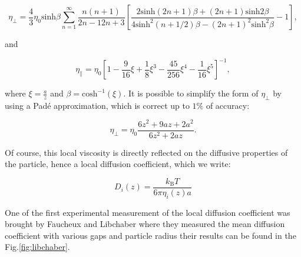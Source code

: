 \begin{equation}
	\eta_\bot = \frac{4}{3} \eta_0 \mathrm{sinh}\beta \sum _{n=1} ^{\infty} \frac{n(n+1)}{{2n-1}{2n+3}}
	\left[
	\frac
	{
		2\mathrm{sinh}(2n + 1)\beta + (2n +1)\mathrm{sinh}2\beta
	}
	{
		4\mathrm{sinh}^2(n + 1 /2)\beta  - (2n+1)^2 \mathrm{sinh}^2 \beta
	}
	-1
	\right] ,
	\label{Eq:etaz}
\end{equation}

and 

\begin{equation}
	\eta_\parallel = \eta_0 
	\left[
		1 - \frac{9}{16} \xi + \frac{1}{8}\xi^3 - \frac{45}{256}\xi^4 - \frac{1}{16}\xi^5
	\right]^{-1},
	\label{Eq:etax}
\end{equation}

where $\xi = \frac{a}{z}$ and $\beta = \mathrm{cosh}^{-1}(\xi)$. It is possible to simplify the form of $\eta_\bot$ by using a Padé approximation, which is correct up to $1\%$ of accuracy:

\begin{equation}
	\eta_\bot = \eta_0 \frac{6z^2 + 9az + 2a^2}{6z^2 + 2az}.
\end{equation}

Of course, this local viscosity is directly reflected on the diffusive properties of the particle, hence a local diffusion coefficient, which we write:

\begin{equation}
	D_i (z) = \frac{k_\mathrm{B} T}{6\pi\eta_i (z) a} 
\end{equation}

One of the first experimental measurement of the local diffusion coefficient was brought by Faucheux and Libchaber \cite{faucheux_confined_1994} where they measured the mean diffusion coefficient with various gaps and particle radius their results can be found in the Fig.\ref{fig:libchaber}.

